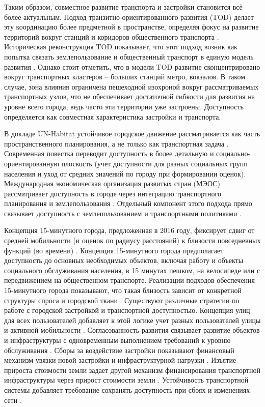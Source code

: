 Таким образом, совместное развитие транспорта и застройки становится всё более актуальным. Подход транзитно-ориентированного развития (TOD) делает эту координацию более предметной в пространстве, определяя фокус на развитие территорий вокруг станций и коридоров общественного транспорта \cite{worldbankTod3v}. Историческая реконструкция TOD показывает, что этот подход возник как попытка связать землепользование и общественный транспорт в единую модель развития \cite{carlton2009tod}. Однако стоит отметить, что в модели TOD развитие сконцентрировано вокруг транспортных кластеров -- больших станций метро, вокзалов. В таком случае, зона влияния ограничена пешеходной изохроной вокруг рассматриваемых транспортных узлов, что не обеспечивает достаточной гибкости для развития на уровне всего города, ведь часто эти территории уже застроены. Доступность определяется как совместная характеристика застройки и транспорта.

В докладе UN-Habitat устойчивое городское движение рассматривается как часть пространственного планирования, а не только как транспортная задача \cite{unhabitat2013mobility}. Современная повестка переводит доступность в более детальную и социально-ориентированную плоскость (учет доступности для разных социальных групп населения и уход от средних значений по городу при формировании оценок). Международная экономическая организация развитых стран (МЭОС) рассматривает доступность в городе через интеграцию транспортного планирования и землепользования \cite{oecd2020accessibleCities}. Отдельный компонент этого подхода прямо связывает доступность с землепользованием и транспортными политиками \cite{oecdLandUseAccessibility}.

Концепция 15-минутного города, предложенная в 2016 году, фиксирует сдвиг от средней мобильности (и оценок по радиусу расстояний) к близости повседневных функций (во времени) \cite{allam2022fifteenMinute}. Концепция 15-минутного города предполагает доступность до основных необходимых объектов, включая работу и объекты социального обслуживания населения, в 15 минутах пешком, на велосипеде или с передвижением на общественном транспорте. Реализации подходов обеспечения 15-минутного города показывают, что такая близость зависит от конкретной структуры спроса и городской ткани \cite{papas2024thessaloniki}. Существуют различные стратегии по работе с городской застройкой и транспортной доступностью. Концепция улиц для всех пользователей добавляет к этой логике учет разных пользователей улицы и активной мобильности \cite{iteCompleteStreets}. Согласованность развития связывает развитие объектов и инфраструктуры с одновременным выполнением требований к уровню обслуживания \cite{mrscConcurrency}. Сборы за воздействие застройки показывают финансовый механизм увязки новой застройки и инфраструктурной нагрузки \cite{fhwaImpactFees}. Изъятие прироста стоимости земли задает другой механизм финансирования транспортной инфраструктуры через прирост стоимости земли \cite{oecd2022landValue}. Устойчивость транспортной системы добавляет требование сохранять доступность при сбоях и изменениях сети \cite{itf2024resilience}.


